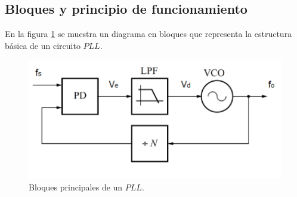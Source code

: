 \documentclass[twocolumn]{article}
\begin{document}
\subsection{Bloques y principio de funcionamiento}
En la figura \textcolor{blue}{{\ref{fig:fig1}}} se muestra un diagrama en bloques que representa la estructura básica de un circuito $PLL$.

\begin{figure}[H]
  \centering    
  \includegraphics[width=\columnwidth]{imagenes/fig1.jpg}
	\caption{Bloques principales de un $PLL$.}\label{fig:fig1}
\end{figure}
\end{document}
